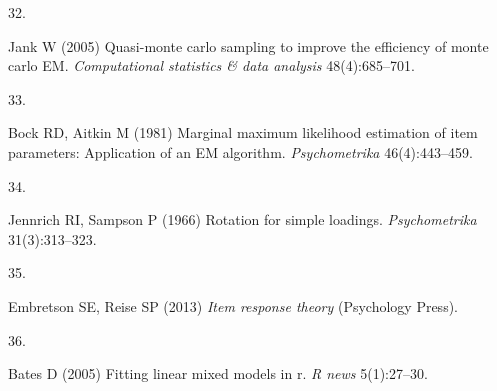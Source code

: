 \documentclass[man]{apa7}
\newlength{\csllabelwidth}
\newcommand{\CSLLeftMargin}[1]{\parbox[t]{\csllabelwidth}{#1}}
\begin{document}
\leavevmode\hypertarget{ref-jank2005quasi}{}%
\CSLLeftMargin{32. }Jank W (2005) Quasi-monte carlo sampling to improve the
efficiency of monte carlo EM. \emph{Computational statistics \& data
analysis} 48(4):685--701.

\leavevmode\hypertarget{ref-bock1981marginal}{}%
\CSLLeftMargin{33. }Bock RD, Aitkin M (1981) Marginal maximum likelihood
estimation of item parameters: Application of an EM algorithm.
\emph{Psychometrika} 46(4):443--459.

\leavevmode\hypertarget{ref-jennrich1966rotation}{}%
\CSLLeftMargin{34. }Jennrich RI, Sampson P (1966) Rotation for simple
loadings. \emph{Psychometrika} 31(3):313--323.

\leavevmode\hypertarget{ref-embretson2013item}{}%
\CSLLeftMargin{35. }Embretson SE, Reise SP (2013) \emph{Item response
theory} (Psychology Press).

\leavevmode\hypertarget{ref-bates2005fitting}{}%
\CSLLeftMargin{36. }Bates D (2005) Fitting linear mixed models in r. \emph{R
news} 5(1):27--30.
\end{document}
